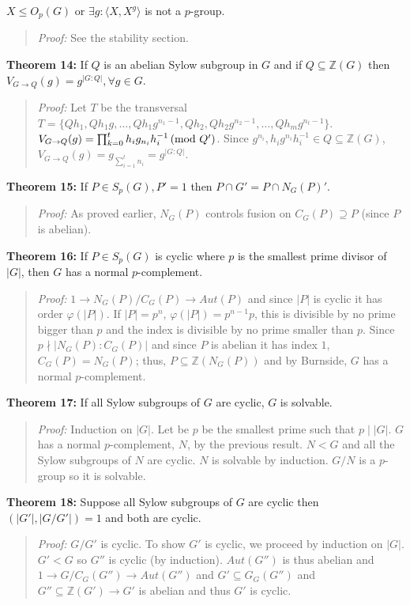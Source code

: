 $X \le O_p(G)$ or $\exists g: \langle X, X^g \rangle $ is not a $p$-group.
\begin{quote}
\emph{Proof:}  
See the stability section.
\end{quote}
{\bf Theorem 14:} If $Q$ is an abelian Sylow subgroup in $G$ and if $Q \subseteq {\mathbb Z}(G)$ then
$V_{G \rightarrow Q}(g)= g^{|G:Q|}, \forall g \in G$.  
\begin{quote}
\emph{Proof:}  
Let $T$ be the transversal 
$T= \{ Qh_1, Qh_1g, \ldots , Qh_1g^{n_1-1}, Qh_2, Qh_2 g^{n_2-1}, \ldots, Qh_m g^{n_t-1} \}$. 
$V_{G \rightarrow Q}(g)= \prod_{k=0}^t h_i g_{n_i} h_i^{-1} \thinspace \textnormal{(mod } Q' \textnormal{)}$.  Since 
$g^{n_i}, h_i g^{n_i} h_i^{-1} \in Q \subseteq {\mathbb Z}(G)$, 
$V_{G \rightarrow Q}(g)= g_{\sum_{i=1}^t n_i} = g^{|G:Q|}$. 
\end{quote}
{\bf Theorem 15:}
If $P \in S_p (G), P'=1$ then $P \cap G' = P \cap N_G(P)'$.
\begin{quote}
\emph{Proof:}  
As proved earlier, $N_G(P)$ controls fusion on $C_G(P) \supseteq P$ (since $P$ is abelian).
\end{quote}
{\bf Theorem 16:} If $P \in S_p(G)$ is cyclic where $p$ is the smallest prime divisor of $|G|$,
then $G$ has a normal $p$-complement.
\begin{quote}
\emph{Proof:}  
$1 \rightarrow N_G(P)/C_G(P) \rightarrow Aut(P)$ and since $|P|$ is cyclic it has order
$\varphi(|P|)$.  If $|P|= p^n$, $\varphi(|P|)= p^{n-1}p$, this is divisible by no prime
bigger than $p$ and the index is divisible by no prime smaller than $p$.  
Since $p \nmid |N_G(P):C_G(P)|$ and since $P$ is abelian it has index $1$, $C_G(P)= N_G(P)$;
thus, $P \subseteq  {\mathbb Z}(N_G(P))$ and by Burnside, $G$ has a normal $p$-complement.
\end{quote}
{\bf Theorem 17:}
If all Sylow subgroups of $G$ are cyclic, $G$ is solvable.  
\begin{quote}
\emph{Proof:}  
Induction on $|G|$.  Let be $p$ be the smallest prime such that $p \mid |G|$.
$G$ has a normal $p$-complement, $N$, by the previous result.  $N < G$ and all the
Sylow subgroups of $N$ are cyclic.  $N$ is solvable by induction. $G/N$ is a $p$-group
so it is solvable.
\end{quote}
{\bf Theorem 18:}
Suppose all Sylow subgroups of $G$ are cyclic then $(|G'|, |G/G'|)=1$ and both are cyclic.
\begin{quote}
\emph{Proof:}  
$G/G'$ is cyclic.  To show $G'$ is cyclic, we proceed by induction on $|G|$.
$G' < G$ so $G''$ is cyclic (by induction).  $Aut(G'')$ is thus abelian and
$1 \rightarrow G/C_G(G'') \rightarrow Aut(G'')$ and $G' \subseteq G_G(G'')$ and
$G'' \subseteq {\mathbb Z}(G') \rightarrow G'$ is abelian and thus $G'$ is cyclic.
\end{quote}
